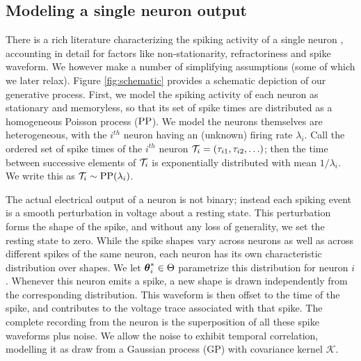 \subsection{Modeling a single neuron output} \label{sec:spike}
There is a rich literature characterizing the spiking activity of a single neuron \citep{?}, accounting in detail for factors like non-stationarity, 
refractoriness and spike waveform. We however make a number of simplifying assumptions (some of which we later relax).
Figure \ref{fig:schematic}  provides a schematic depiction of our generative process.
First, we model the spiking activity of each neuron as stationary and memoryless, so that its set of spike times are 
distributed as a homogeneous Poisson process ($\text{PP}$).  %
 We model the neurons themselves are heterogeneous, with the $i^{th}$ neuron having
an (unknown) firing rate $\lambda_i$. 
Call the ordered set of spike times of the $i^{th}$ neuron $\mathcal{T}_i=(\tau_{i1}, \tau_{i2},\ldots)$; then the time between successive elements of $\mathcal{T}_i$ is 
exponentially distributed with mean $1/\lambda_i$. We write this as
$ \mathcal{T}_i \sim \text{PP}(\lambda_i)$.

The actual electrical output of a neuron is not binary; instead each spiking event is a smooth perturbation in voltage about a
resting state. This perturbation forms the shape of the spike, and without any loss of generality, we set the resting state to zero. 
While the spike shapes vary across neurons as well as across different spikes of the same neuron, each 
neuron has its own characteristic distribution over shapes. 
We let $\boldsymbol{\theta}^*_i \in \Theta$ parametrize this distribution for neuron $i$.
Whenever this neuron emits a 
spike, a new shape is drawn independently from the corresponding distribution. %
This waveform is then offset to the time of the spike, and contributes to the voltage trace associated with that spike. The complete recording from
the neuron is the superposition of all these spike waveforms plus noise.  
We allow the noise to exhibit temporal correlation, modelling it as draw from a Gaussian process (GP) \citep{RasWil2006} with covariance
kernel $\mathcal{K}$. %

